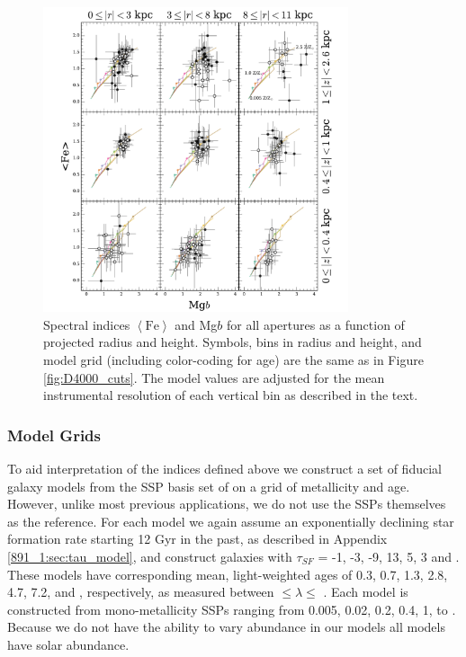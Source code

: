 \begin{figure}[t]
  \centering
  \includegraphics[width=0.8\textwidth]{891_1/figs/Mgb_multires.pdf}
  \caption{\label{fig:Mgb_cuts}\fixspacing Spectral indices
    $\left<\mathrm{Fe}\right>$ and Mg$b$ for all apertures as a
    function of projected radius and height. Symbols, bins in radius
    and height, and model grid (including color-coding for age) are
    the same as in Figure \ref{fig:D4000_cuts}. The model values are
    adjusted for the mean instrumental resolution of each vertical bin
    as described in the text.}
\end{figure}



\subsubsection{Model Grids}
\label{891_1:sec:fidgrid}

To aid interpretation of the indices defined above we construct a set
of fiducial galaxy models from the SSP basis set of \citet{Bruzual03}
on a grid of metallicity and age. However, unlike most previous
applications, we do not use the SSPs themselves as the reference. For
each model we again assume an exponentially declining star formation
rate starting 12 Gyr in the past, as described in Appendix
\ref{891_1:sec:tau_model}, and construct galaxies with $\tau_{SF}$ = -1, -3,
-9, 13, 5, 3 and . These models have corresponding mean,
light-weighted ages of 0.3, 0.7, 1.3, 2.8, 4.7, 7.2, and
, respectively, as measured between 
$\leq\lambda\leq$ . Each model is constructed from
mono-metallicity SSPs ranging from 0.005, 0.02, 0.2, 0.4, 1, to
. Because we do not have the ability to vary abundance
in our models \citep[as done, for example, by][]{Trager08} all models
have solar abundance. 

